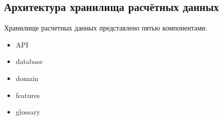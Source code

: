 \subsection*{\large{Архитектура хранилища расчётных данных}}

Хранилище расчетных данных представлено пятью компонентами.
\begin{itemize}
    \item API
    \item database
    \item domain
    \item features
    \item glossary
\end{itemize}